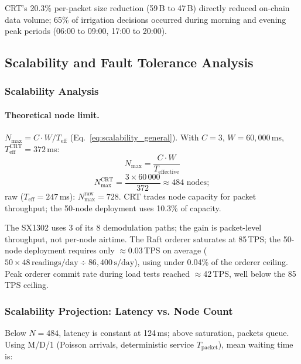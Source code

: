 \documentclass[pdflatex,sn-mathphys-num]{sn-jnl}
\theoremstyle{thmstyleone}
\theoremstyle{thmstyletwo}
\theoremstyle{thmstylethree}
\begin{document}
CRT's 20.3\% per-packet size reduction (59\,B to 47\,B) directly reduced on-chain data volume; 65\% of irrigation decisions occurred during morning and evening peak periods (06:00 to 09:00, 17:00 to 20:00).

\subsection{Scalability and Fault Tolerance Analysis}
\label{subsec:scalability}
\label{sec:network_capacity}

\subsubsection{Scalability Analysis}
\label{subsubsec:scalability_analysis}

\paragraph{Theoretical node limit.} $N_{\max} = C \cdot W / T_{\text{eff}}$ (Eq.~\ref{eq:scalability_general}). With $C=3$, $W=60{,}000$\,ms, $T_{\text{eff}}^{\text{CRT}}=372$\,ms:
\begin{equation}
N_{\max} = \frac{C \cdot W}{T_{\text{effective}}}
\label{eq:scalability_general}
\end{equation}
\begin{equation}
N_{\max}^{\text{CRT}} = \frac{3 \times 60\,000}{372} \approx 484 \text{ nodes};
\label{eq:node_limit}
\end{equation}
raw ($T_{\text{eff}}=247$\,ms): $N_{\max}^{\text{raw}}=728$. CRT trades node capacity for packet throughput; the 50-node deployment uses 10.3\% of capacity.

The SX1302 uses 3 of its 8 demodulation paths; the gain is packet-level throughput, not per-node airtime. The Raft orderer saturates at 85\,TPS; the 50-node deployment requires only $\approx$0.03\,TPS on average ($50 \times 48\,\text{readings/day} \div 86{,}400\,\text{s/day}$), using under 0.04\% of the orderer ceiling. Peak orderer commit rate during load tests reached $\approx$42\,TPS, well below the 85\,TPS ceiling.

\subsubsection{Scalability Projection: Latency vs. Node Count}
\label{subsubsec:scalability_projection}

Below $N=484$, latency is constant at 124\,ms; above saturation, packets queue. Using M/D/1 (Poisson arrivals, deterministic service $T_{\text{packet}}$), mean waiting time is:
\end{document}

